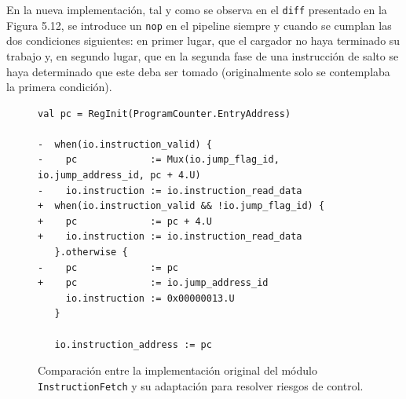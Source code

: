 En la nueva implementación, tal y como se observa en el \texttt{diff} presentado en la Figura 5.12, se introduce un \texttt{nop} en el pipeline siempre y cuando se cumplan las dos condiciones siguientes: en primer lugar, que el cargador no haya terminado su trabajo y, en segundo lugar, que en la segunda fase de una instrucción de salto se haya determinado que este deba ser tomado (originalmente solo se contemplaba la primera condición).

\vspace{+0.5cm}
\begin{figure}[h]
\begin{lstlisting}[style=DiffStyleNoNumbering,columns=fullflexible]
   val pc = RegInit(ProgramCounter.EntryAddress)

-  when(io.instruction_valid) {
-    pc             := Mux(io.jump_flag_id, io.jump_address_id, pc + 4.U)
-    io.instruction := io.instruction_read_data
+  when(io.instruction_valid && !io.jump_flag_id) {
+    pc             := pc + 4.U
+    io.instruction := io.instruction_read_data
   }.otherwise {
-    pc             := pc
+    pc             := io.jump_address_id
     io.instruction := 0x00000013.U
   }

   io.instruction_address := pc
\end{lstlisting}
\vspace{-0.1cm}
\caption{Comparación entre la implementación original del módulo \texttt{InstructionFetch} y su adaptación para resolver riesgos de control.}
\end{figure}